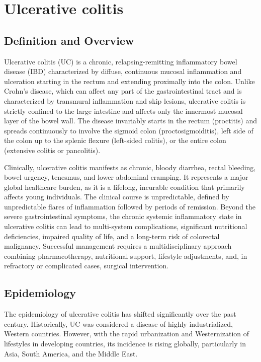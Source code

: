 \chapter{Ulcerative colitis}

\section*{Definition and Overview}
Ulcerative colitis (UC) is a chronic, relapsing-remitting inflammatory bowel disease (IBD) characterized by diffuse, continuous mucosal inflammation and ulceration starting in the rectum and extending proximally into the colon. Unlike Crohn's disease, which can affect any part of the gastrointestinal tract and is characterized by transmural inflammation and skip lesions, ulcerative colitis is strictly confined to the large intestine and affects only the innermost mucosal layer of the bowel wall. The disease invariably starts in the rectum (proctitis) and spreads continuously to involve the sigmoid colon (proctosigmoiditis), left side of the colon up to the splenic flexure (left-sided colitis), or the entire colon (extensive colitis or pancolitis).

Clinically, ulcerative colitis manifests as chronic, bloody diarrhea, rectal bleeding, bowel urgency, tenesmus, and lower abdominal cramping. It represents a major global healthcare burden, as it is a lifelong, incurable condition that primarily affects young individuals. The clinical course is unpredictable, defined by unpredictable flares of inflammation followed by periods of remission. Beyond the severe gastrointestinal symptoms, the chronic systemic inflammatory state in ulcerative colitis can lead to multi-system complications, significant nutritional deficiencies, impaired quality of life, and a long-term risk of colorectal malignancy. Successful management requires a multidisciplinary approach combining pharmacotherapy, nutritional support, lifestyle adjustments, and, in refractory or complicated cases, surgical intervention.

\section*{Epidemiology}
The epidemiology of ulcerative colitis has shifted significantly over the past century. Historically, UC was considered a disease of highly industrialized, Western countries. However, with the rapid urbanization and Westernization of lifestyles in developing countries, its incidence is rising globally, particularly in Asia, South America, and the Middle East.

